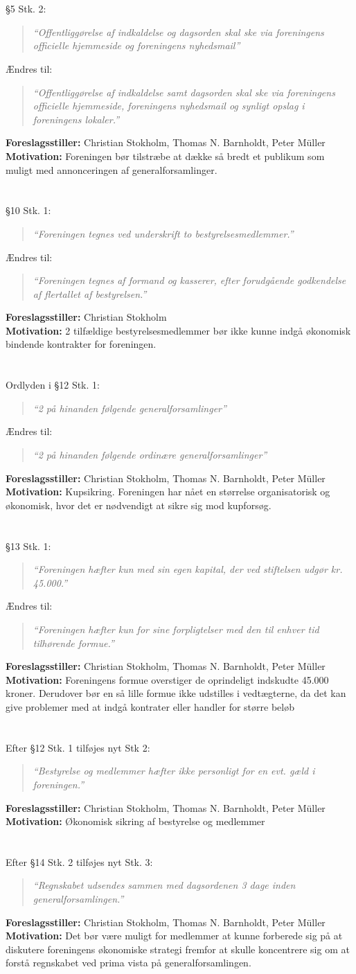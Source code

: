 \documentclass[a4paper,12pt,danish]{article}
\newcommand\cit[1]{
    \begin{quote}
        \textit{``#1''}
    \end{quote}
}
\newcommand\who[1]{
    \textbf{Foreslagsstiller:} #1\\
}
\newcommand\why[1]{
    \textbf{Motivation:} #1\\
}
\newcommand\change[1]{
    \section{}
    #1
}
\begin{document}
\change{
	\S5 Stk. 2:
    \cit{Offentliggørelse af indkaldelse og dagsorden skal ske via foreningens officielle hjemmeside og foreningens nyhedsmail}
    Ændres til:
    \cit{Offentliggørelse af indkaldelse samt dagsorden skal ske via foreningens officielle hjemmeside, foreningens nyhedsmail og synligt opslag i foreningens lokaler.}
    \who{Christian Stokholm, Thomas N. Barnholdt, Peter Müller}
    \why{Foreningen bør tilstræbe at dække så bredt et publikum som muligt med annonceringen af generalforsamlinger.}
}

\change{
	\S10 Stk. 1:
    \cit{Foreningen tegnes ved underskrift to bestyrelsesmedlemmer.}
    Ændres til:
    \cit{Foreningen tegnes af formand og kasserer, efter forudgående godkendelse af flertallet af bestyrelsen.}
    \who{Christian Stokholm}
    \why{2 tilfældige bestyrelsesmedlemmer bør ikke kunne indgå økonomisk bindende kontrakter for foreningen.}
}

\change{
	Ordlyden i \S12 Stk. 1:
    \cit{2 på hinanden følgende generalforsamlinger}
    Ændres til:
    \cit{2 på hinanden følgende ordinære generalforsamlinger}
    \who{Christian Stokholm, Thomas N. Barnholdt, Peter Müller}
    \why{Kupsikring. Foreningen har nået en størrelse organisatorisk og økonomisk, hvor det er nødvendigt at sikre sig mod kupforsøg.}
}

\change{
	\S13 Stk. 1:
    \cit{Foreningen hæfter kun med sin egen kapital, der ved stiftelsen udgør kr. 45.000.}
    Ændres til:
    \cit{Foreningen hæfter kun for sine forpligtelser med den til enhver tid tilhørende formue.}
    \who{Christian Stokholm, Thomas N. Barnholdt, Peter Müller}
    \why{Foreningens formue overstiger de oprindeligt indskudte 45.000 kroner. Derudover bør en så lille formue ikke udstilles i vedtægterne, da det kan give problemer med at indgå kontrater eller handler for større beløb}
}

\change{
	Efter \S12 Stk. 1 tilføjes nyt Stk 2:
    \cit{Bestyrelse og medlemmer hæfter ikke personligt for en evt. gæld i foreningen.}
    \who{Christian Stokholm, Thomas N. Barnholdt, Peter Müller}
    \why{Økonomisk sikring af bestyrelse og medlemmer}
}

\change{
	Efter \S14 Stk. 2 tilføjes nyt Stk. 3:
    \cit{Regnskabet udsendes sammen med dagsordenen 3 dage inden generalforsamlingen.}
    \who{Christian Stokholm, Thomas N. Barnholdt, Peter Müller}
    \why{Det bør være muligt for medlemmer at kunne forberede sig på at diskutere foreningens økonomiske strategi fremfor at skulle koncentrere sig om at forstå regnskabet ved prima vista på generalforsamlingen.}
}
\end{document}
